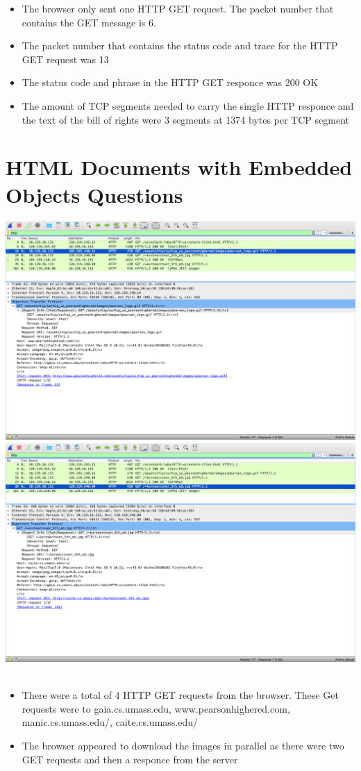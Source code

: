 \documentclass{article}
\begin{document}
\begin{itemize}
  \item The browser only sent one HTTP GET request. The packet number that contains the GET message is 6.
  \item The packet number that contains the status code and trace for the HTTP GET request was 13
  \item The status code and phrase in the HTTP GET responce was 200 OK
  \item The amount of TCP segments needed to carry the single HTTP responce and the text of the bill of rights were 3 segments at 1374 bytes per TCP segment
\end{itemize}

\section {HTML Documents with Embedded Objects Questions}
\includegraphics[width=\textwidth]{HTMLDocumentsWithEmbeddedObjectsGetGif}\\
\includegraphics[width=\textwidth]{HTMLDocumentsWithEmbeddedObjectsGetJPG}\\\\
\begin{itemize}
  \item There were a total of 4 HTTP GET requests from the browser. These Get requests were to gaia.cs.umass.edu, www.pearsonhighered.com, manic.cs.umass.edu/, caite.cs.umass.edu/
  \item The browser appeared to download the images in parallel as there were two GET requests and then a responce from the server
\end{itemize}
\end{document}
